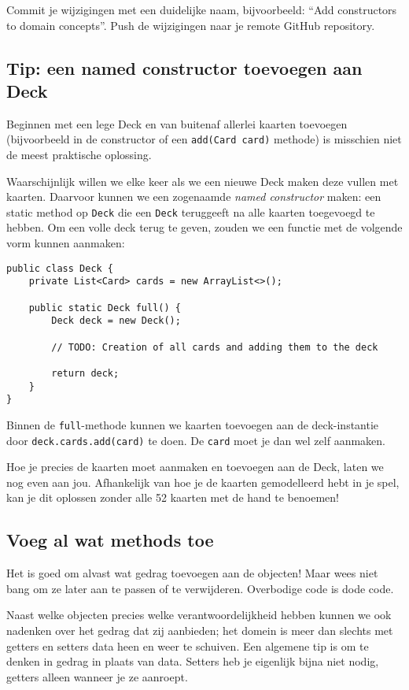 \documentclass[dutch,a4paper,12pt,doubleside]{book}
\begin{document}
Commit je wijzigingen met een duidelijke naam, 
bijvoorbeeld: ``Add constructors to domain concepts''. 
Push de wijzigingen naar je remote GitHub repository.

\subsection{Tip: een named constructor toevoegen aan Deck}
Beginnen met een lege Deck en van buitenaf allerlei kaarten toevoegen 
(bijvoorbeeld in de constructor of een \texttt{add(Card card)} methode)
is misschien niet de meest praktische oplossing.

Waarschijnlijk willen we elke keer als we een nieuwe Deck maken
deze vullen met kaarten. Daarvoor kunnen we een zogenaamde \textit{named constructor}
maken: een static method op \texttt{Deck} die een \texttt{Deck} teruggeeft 
na alle kaarten toegevoegd te hebben. Om een volle deck terug te geven, zouden 
we een functie met de volgende vorm kunnen aanmaken:

\begin{verbatim}
public class Deck {
    private List<Card> cards = new ArrayList<>();

    public static Deck full() {
        Deck deck = new Deck();

        // TODO: Creation of all cards and adding them to the deck

        return deck;
    }
}
\end{verbatim}

Binnen de \texttt{full}-methode kunnen we kaarten toevoegen aan de 
deck-instantie door \texttt{deck.cards.add(card)} te doen. De \texttt{card}
moet je dan wel zelf aanmaken.

Hoe je precies de kaarten moet aanmaken en toevoegen aan de Deck,
laten we nog even aan jou. Afhankelijk van hoe je de kaarten gemodelleerd hebt 
in je spel, kan je dit oplossen zonder alle 52 kaarten met de hand te benoemen!

\subsection{Voeg al wat methods toe}
Het is goed om alvast wat gedrag toevoegen aan de objecten!
Maar wees niet bang om ze later aan te passen of te verwijderen.
Overbodige code is dode code.

Naast welke objecten precies welke verantwoordelijkheid hebben 
kunnen we ook nadenken over het gedrag dat zij aanbieden; 
het domein is meer dan slechts met getters en setters data heen en weer te schuiven. 
Een algemene tip is om te denken in gedrag in plaats van data. 
Setters heb je eigenlijk bijna niet nodig, getters alleen wanneer je ze aanroept. 
\end{document}
